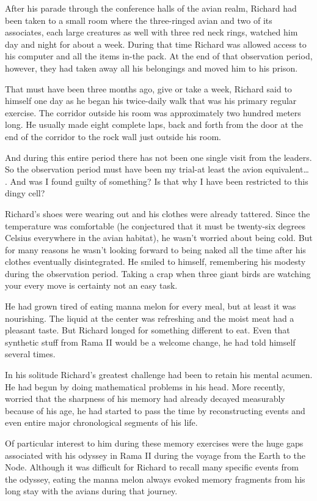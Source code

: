 \documentclass[]{article}
\begin{document}
{After his parade through the conference halls of the avian realm, Richard had been taken to a small room where the three-ringed avian and two of its associates, each large creatures as well with three red neck rings, watched him day and night for about a week. During that time Richard was allowed access to his computer and all the items in-the pack. At the end of that observation period, however, they had taken away all his belongings and moved him to his prison.

That must have been three months ago, give or take a week, Richard said to himself one day as he began his twice-daily walk that was his primary regular exercise. The corridor outside his room was approximately two hundred meters long. He usually made eight complete laps, back and forth from the door at the end of the corridor to the rock wall just outside his room.

And during this entire period there has not been one single visit from the leaders. So the observation period must have been my trial-at least the avion equivalent… . And was I found guilty of something? Is that why I have been restricted to this dingy cell?

Richard’s shoes were wearing out and his clothes were already tattered. Since the temperature was comfortable (he conjectured that it must be twenty-six degrees Celsius everywhere in the avian habitat), he wasn’t worried about being cold. But for many reasons he wasn’t looking forward to being naked all the time after his clothes eventually disintegrated. He smiled to himself, remembering his modesty during the observation period. Taking a crap when three giant birds are watching your every move is certainty not an easy task.

He had grown tired of eating manna melon for every meal, but at least it was nourishing. The liquid at the center was refreshing and the moist meat had a pleasant taste. But Richard longed for something different to eat. Even that synthetic stuff from Rama II would be a welcome change, he had told himself several times.

In his solitude Richard’s greatest challenge had been to retain his mental acumen. He had begun by doing mathematical problems in his head. More recently, worried that the sharpness of his memory had already decayed measurably because of his age, he had started to pass the time by reconstructing events and even entire major chronological segments of his life.

Of particular interest to him during these memory exercises were the huge gaps associated with his odyssey in Rama II during the voyage from the Earth to the Node. Although it was difficult for Richard to recall many specific events from the odyssey, eating the manna melon always evoked memory fragments from his long stay with the avians during that journey.

}
\end{document}
